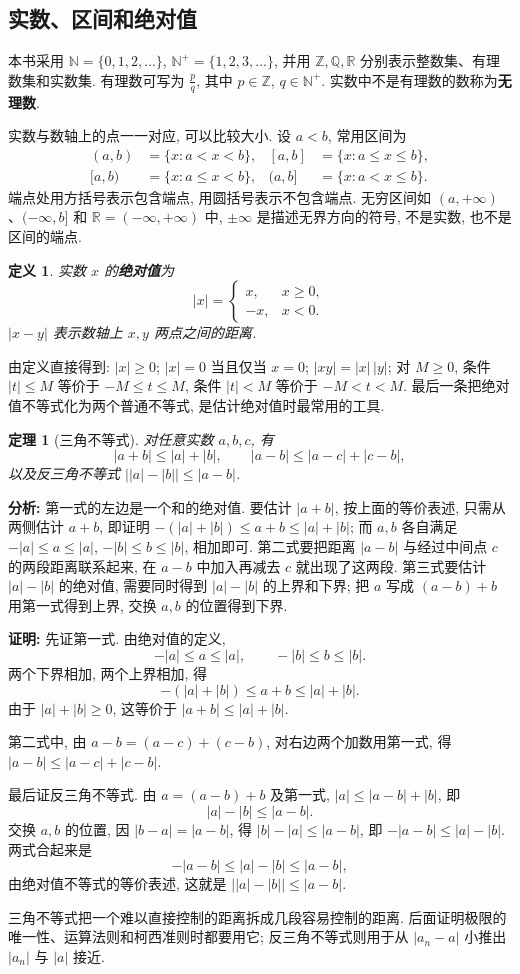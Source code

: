 \documentclass[UTF8,openany]{ctexbook}
\theoremstyle{chinesetextbook}
\newtheorem{definition}{定义}[section]
\newtheorem{theorem}{定理}[section]
\newenvironment{cnproof}{\par\indent\textbf{证明:} \ignorespaces}{\par}
\begin{document}
\subsection{实数、区间和绝对值}
本书采用 $\mathbb N=\{0,1,2,\ldots\}$, $\mathbb N^+=\{1,2,3,\ldots\}$, 并用 $\mathbb Z,\mathbb Q,\mathbb R$ 分别表示整数集、有理数集和实数集. 有理数可写为 $\displaystyle\frac pq$, 其中 $p\in\mathbb Z$, $q\in\mathbb N^+$. 实数中不是有理数的数称为\textbf{无理数}.

实数与数轴上的点一一对应, 可以比较大小. 设 $a<b$, 常用区间为
\[
\begin{aligned}
(a,b)&=\{x:a<x<b\},& [a,b]&=\{x:a\le x\le b\},\\
[a,b)&=\{x:a\le x<b\},& (a,b]&=\{x:a<x\le b\}.
\end{aligned}
\]
端点处用方括号表示包含端点, 用圆括号表示不包含端点. 无穷区间如 $(a,+\infty)$、$(-\infty,b]$ 和 $\mathbb R=(-\infty,+\infty)$ 中, $\pm\infty$ 是描述无界方向的符号, 不是实数, 也不是区间的端点.
\begin{definition}
实数 $x$ 的\textbf{绝对值}为
\[
|x|=\begin{cases}x,&x\ge0,\\-x,&x<0.\end{cases}
\]
$|x-y|$ 表示数轴上 $x,y$ 两点之间的距离.
\end{definition}
由定义直接得到: $|x|\ge0$; $|x|=0$ 当且仅当 $x=0$; $|xy|=|x|\,|y|$; 对 $M\ge0$, 条件 $|t|\le M$ 等价于 $-M\le t\le M$, 条件 $|t|<M$ 等价于 $-M<t<M$. 最后一条把绝对值不等式化为两个普通不等式, 是估计绝对值时最常用的工具.
\begin{theorem}[三角不等式]
对任意实数 $a,b,c$, 有
\[
|a+b|\le|a|+|b|,\qquad |a-b|\le|a-c|+|c-b|,
\]
以及反三角不等式 $\bigl||a|-|b|\bigr|\le|a-b|$.
\end{theorem}
\par\indent\textbf{分析:} 第一式的左边是一个和的绝对值. 要估计 $|a+b|$, 按上面的等价表述, 只需从两侧估计 $a+b$, 即证明 $-(|a|+|b|)\le a+b\le|a|+|b|$; 而 $a,b$ 各自满足 $-|a|\le a\le|a|$, $-|b|\le b\le|b|$, 相加即可. 第二式要把距离 $|a-b|$ 与经过中间点 $c$ 的两段距离联系起来, 在 $a-b$ 中加入再减去 $c$ 就出现了这两段. 第三式要估计 $|a|-|b|$ 的绝对值, 需要同时得到 $|a|-|b|$ 的上界和下界; 把 $a$ 写成 $(a-b)+b$ 用第一式得到上界, 交换 $a,b$ 的位置得到下界.
\begin{cnproof}
先证第一式. 由绝对值的定义,
\[
-|a|\le a\le|a|,\qquad -|b|\le b\le|b|.
\]
两个下界相加, 两个上界相加, 得
\[
-(|a|+|b|)\le a+b\le|a|+|b|.
\]
由于 $|a|+|b|\ge0$, 这等价于 $|a+b|\le|a|+|b|$.

第二式中, 由 $a-b=(a-c)+(c-b)$, 对右边两个加数用第一式, 得 $|a-b|\le|a-c|+|c-b|$.

最后证反三角不等式. 由 $a=(a-b)+b$ 及第一式, $|a|\le|a-b|+|b|$, 即
\[
|a|-|b|\le|a-b|.
\]
交换 $a,b$ 的位置, 因 $|b-a|=|a-b|$, 得 $|b|-|a|\le|a-b|$, 即 $-|a-b|\le|a|-|b|$. 两式合起来是
\[
-|a-b|\le|a|-|b|\le|a-b|,
\]
由绝对值不等式的等价表述, 这就是 $\bigl||a|-|b|\bigr|\le|a-b|$.
\end{cnproof}
三角不等式把一个难以直接控制的距离拆成几段容易控制的距离. 后面证明极限的唯一性、运算法则和柯西准则时都要用它; 反三角不等式则用于从 $|a_n-a|$ 小推出 $|a_n|$ 与 $|a|$ 接近.
\end{document}
